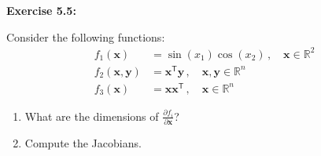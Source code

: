 \documentclass[12pt, a4paper]{article}
\newcommand{\R}{\mathbb{R}}        %
\newcommand{\bx}{\bm{x}}           %
\newcommand{\by}{\bm{y}}           %
\newcommand{\T}{\mathsf{T}}                      %
\newenvironment{problem}[1][Problem]{\noindent\textbf{#1:}\par\vspace{0.5em}}{\vspace{1em}}
\newenvironment{solution}{\noindent\textit{Solution.}\par\vspace{0.5em}}{\vspace{2em}}
\begin{document}
%
%

\begin{problem}[Exercise 5.5]
  Consider the following functions:
  \begin{align*}
    f_1(\bx) &= \sin(x_1)\cos(x_2) \,, \quad \bx \in \R^2 \\
    f_2(\bx, \by) &= \bx^\T \by \,, \quad \bx, \by \in \R^n \\
    f_3(\bx) &= \bx\bx^\T \,, \quad \bx \in \R^n
  \end{align*}
  \begin{enumerate}[label=\alph*.]
    \item What are the dimensions of $\frac{\partial f_i}{\partial \bx}$?
    \item Compute the Jacobians.
  \end{enumerate}
\end{problem}
\end{document}
